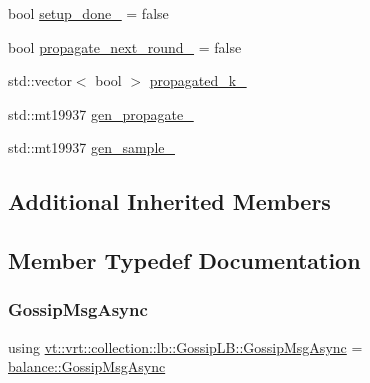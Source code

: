 \begin{DoxyCompactItemize}
\item 
bool \hyperlink{structvt_1_1vrt_1_1collection_1_1lb_1_1_gossip_l_b_a6ef78f0645125746c90fb74cb1afde19}{setup\+\_\+done\+\_\+} = false
\item 
bool \hyperlink{structvt_1_1vrt_1_1collection_1_1lb_1_1_gossip_l_b_a471c26c302308bd086dab74ff8c95858}{propagate\+\_\+next\+\_\+round\+\_\+} = false
\item 
std\+::vector$<$ bool $>$ \hyperlink{structvt_1_1vrt_1_1collection_1_1lb_1_1_gossip_l_b_aefa8729d5332f53c5dd9d688c16d2f7b}{propagated\+\_\+k\+\_\+}
\item 
std\+::mt19937 \hyperlink{structvt_1_1vrt_1_1collection_1_1lb_1_1_gossip_l_b_a29446756cec8d60377589ff603dcc43c}{gen\+\_\+propagate\+\_\+}
\item 
std\+::mt19937 \hyperlink{structvt_1_1vrt_1_1collection_1_1lb_1_1_gossip_l_b_a7cdf4fff7a19f1b89b3a58fd87ece7f1}{gen\+\_\+sample\+\_\+}
\end{DoxyCompactItemize}
\subsection*{Additional Inherited Members}


\subsection{Member Typedef Documentation}
\mbox{\label{structvt_1_1vrt_1_1collection_1_1lb_1_1_gossip_l_b_a6da4208feb7b153c54595d06f82d5e56}} 
\subsubsection{\texorpdfstring{Gossip\+Msg\+Async}{GossipMsgAsync}}
{\footnotesize\ttfamily using \hyperlink{structvt_1_1vrt_1_1collection_1_1lb_1_1_gossip_l_b_a6da4208feb7b153c54595d06f82d5e56}{vt\+::vrt\+::collection\+::lb\+::\+Gossip\+L\+B\+::\+Gossip\+Msg\+Async} =  \hyperlink{structvt_1_1vrt_1_1collection_1_1balance_1_1_gossip_msg_async}{balance\+::\+Gossip\+Msg\+Async}}

\mbox{\label{structvt_1_1vrt_1_1collection_1_1lb_1_1_gossip_l_b_a39aebe4c174695c551b5b9a907bac615}} 
